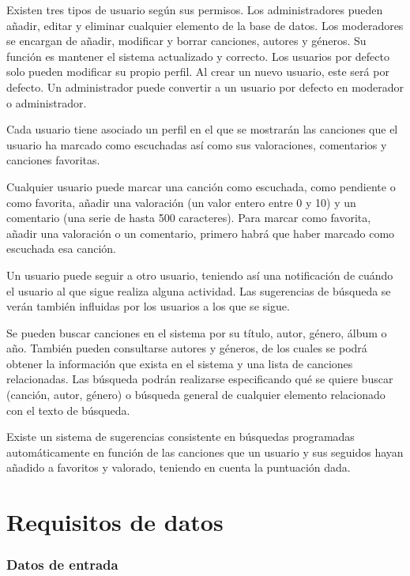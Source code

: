Existen tres tipos de usuario según sus permisos. Los administradores pueden añadir, editar y eliminar cualquier elemento de la base de datos. Los moderadores se encargan de añadir, modificar y borrar canciones, autores y géneros. Su función es mantener el sistema actualizado y correcto. Los usuarios por defecto solo pueden modificar su propio perfil. Al crear un nuevo usuario, este será por defecto. Un administrador puede convertir a un usuario por defecto en moderador o administrador.

Cada usuario tiene asociado un perfil en el que se mostrarán las canciones que el usuario ha marcado como escuchadas así como sus valoraciones, comentarios y canciones favoritas.


Cualquier usuario puede marcar una canción como escuchada, como pendiente o como favorita, añadir una valoración (un valor entero entre 0 y 10) y un comentario (una serie de hasta 500 caracteres). Para marcar como favorita, añadir una valoración o un comentario, primero habrá que haber marcado como escuchada esa canción.

Un usuario puede seguir a otro usuario, teniendo así una notificación de cuándo el usuario al que sigue realiza alguna actividad. Las sugerencias de búsqueda se verán también influidas por los usuarios a los que se sigue.



Se pueden buscar canciones en el sistema por su título, autor, género, álbum o año. También pueden consultarse autores y géneros, de los cuales se podrá obtener la información que exista en el sistema y una lista de canciones relacionadas. Las búsqueda podrán realizarse especificando qué se quiere buscar (canción, autor, género) o búsqueda general de cualquier elemento relacionado con el texto de búsqueda.

Existe un sistema de sugerencias consistente en búsquedas programadas automáticamente en función de las canciones que un usuario y sus seguidos hayan añadido a favoritos y valorado, teniendo en cuenta la puntuación dada.

\section{Requisitos de datos}
\subsubsection{Datos de entrada}

